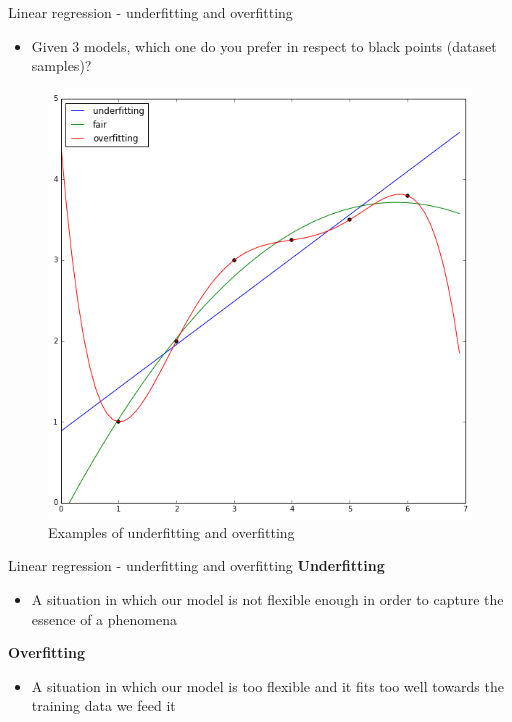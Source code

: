 \documentclass[aspectratio=169]{beamer}
\begin{document}
\begin{frame}{Linear regression - underfitting and overfitting}
    \begin{itemize}
        \item Given 3 models, which  one do you prefer in respect to black points (dataset samples)?
    \end{itemize}
    \begin{center}
        \begin{figure}
            \includegraphics[scale=0.27]{./images/overunderfit.png}
            \caption{Examples of underfitting and overfitting}
        \end{figure}
    \end{center}
\end{frame}
\begin{frame}{Linear regression - underfitting and overfitting}
    \textbf{Underfitting}
    \begin{itemize}
        \item A situation in which our model is not flexible enough in order
            to capture the essence of a phenomena
    \end{itemize}
    \textbf{Overfitting}
    \begin{itemize}
        \item A situation in which our model is too flexible and it fits too well
            towards the training data we feed it
    \end{itemize}
\end{frame}
\end{document}
